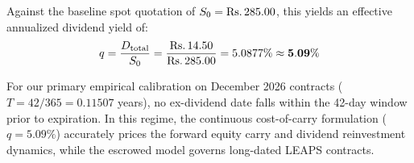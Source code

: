 Against the baseline spot quotation of $S_0 = \text{\text{Rs.}\,}285.00$, this yields an effective annualized dividend yield of:
\begin{equation}
    q = \frac{D_{\text{total}}}{S_0} = \frac{\text{\text{Rs.}\,}14.50}{\text{\text{Rs.}\,}285.00} = 5.0877\% \approx \mathbf{5.09\%}
    \label{eq:dividend_yield_calc}
\end{equation}

For our primary empirical calibration on December 2026 contracts ($T = 42/365 = 0.11507$ years), no ex-dividend date falls within the 42-day window prior to expiration. In this regime, the continuous cost-of-carry formulation ($q = 5.09\%$) accurately prices the forward equity carry and dividend reinvestment dynamics, while the escrowed model governs long-dated LEAPS contracts.

\clearpage
